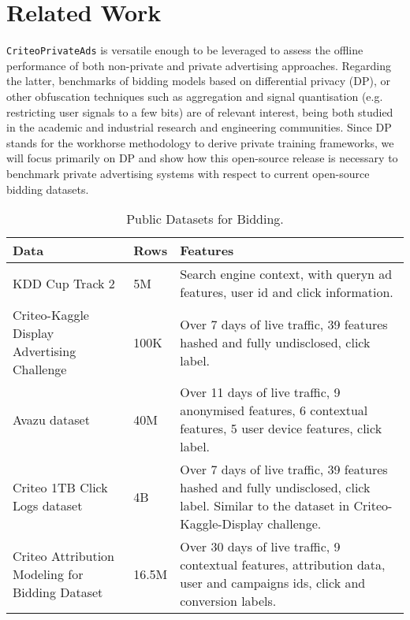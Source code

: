 \section{Related Work}
\label{sec:related_work}

\texttt{CriteoPrivateAds} is versatile enough to be leveraged to assess the offline performance of both non-private and private advertising approaches. 
Regarding the latter, benchmarks of bidding models based on differential privacy (DP), or other obfuscation techniques such as aggregation and signal quantisation (e.g. restricting user signals to a few bits) are of relevant interest, being both studied in the academic and industrial research and engineering communities.
Since DP stands for the workhorse methodology to derive private training frameworks, we will focus primarily on DP and show how this open-source release is necessary to benchmark private advertising systems with respect to current open-source bidding datasets.\\

\begin{table}[ht]
\centering
\renewcommand{\arraystretch}{1.2} %
\footnotesize
\begin{tabular}{|p{2cm}|p{1cm}|p{3.3cm}|}
\hline
\textbf{Data} & \textbf{Rows} & \textbf{Features} \\ \hline 
KDD Cup Track 2 \citep{kddcup2012_track2} & 5M & Search engine context, with queryn ad features, user id and click information.\\ \hline
Criteo-Kaggle Display Advertising Challenge \citep{criteo-display-ad-challenge} 
& 100K  &  Over 7 days of live traffic, 39 features hashed and fully undisclosed, click label.  \\ \hline
Avazu dataset \citep{Avazu2015} & 40M & Over 11 days of live traffic, 9 anonymised features, 6 contextual features, 5 user device features, click label. \\ \hline
Criteo 1TB Click Logs dataset \citep{criteo_1tb_dataset}
 & 4B  & Over 7 days of live traffic, 39 features hashed and fully undisclosed, click label. Similar to the dataset in Criteo-Kaggle-Display challenge. \\ \hline
 Criteo Attribution Modeling for Bidding Dataset \citep{DiemertMeynet2017}
 & 16.5M  & Over 30 days of live traffic, 9 contextual features, attribution data, user and campaigns ids, click and conversion labels. \\ \hline
\end{tabular}
\caption{Public Datasets for Bidding.}
\label{tab:dataset_overview}
\end{table}

